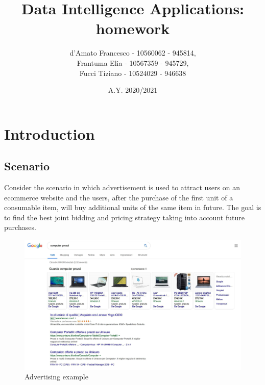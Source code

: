 \documentclass[12pt,a4paper]{report}
\title{Data Intelligence Applications: homework}
\author{d'Amato Francesco - 10560062 - 945814, \\
	Frantuma Elia - 10567359 - 945729, \\
	Fucci Tiziano - 10524029 - 946638}
\date{A.Y. 2020/2021}
\begin{document}
	\maketitle
	\tableofcontents
	\chapter{Introduction}
		\section{Scenario}
			Consider the scenario in which advertisement is used to attract users on an ecommerce website and the users, after the purchase of the first unit of a consumable item, will buy additional units of the same item in future. The goal is to find the best joint bidding and pricing strategy taking into account future purchases.

\begin{figure}[H]
\centering
  \includegraphics[scale = 0.3, center]{image0}
  \caption{Advertising example}
\end{figure}
\end{document}
